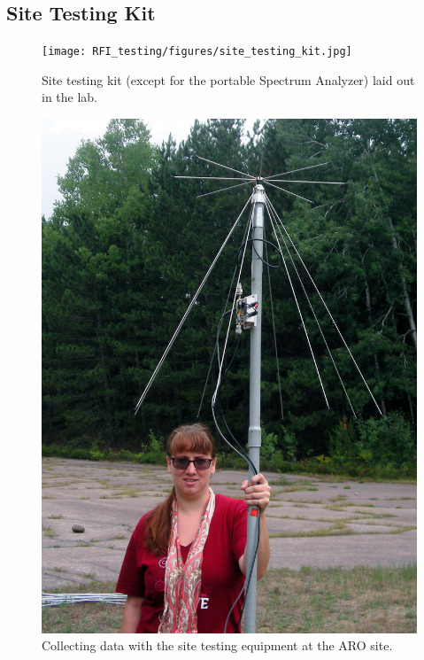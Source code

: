 \subsection{Site Testing Kit}

\begin{figure}[htb]
\centering
\begin{minipage}[b]{0.47\textwidth}
\centering
\texttt{[image: RFI\_testing/figures/site\_testing\_kit.jpg]}
\caption{Site testing kit (except for the portable Spectrum Analyzer) laid out in the lab.}
\label{Fig:site_kit}
\end{minipage}%
\begin{minipage}[b]{0.02\textwidth}
\hspace{1cm}
\end{minipage}%
\begin{minipage}[b]{0.47\textwidth}
\centering
\includegraphics[width=0.95\linewidth]{RFI_testing/figures/voytek_site_test_alg.jpg}
\caption{Collecting data with the site testing equipment at the ARO site.}
\label{Fig:aroant}
\end{minipage}
\end{figure}

